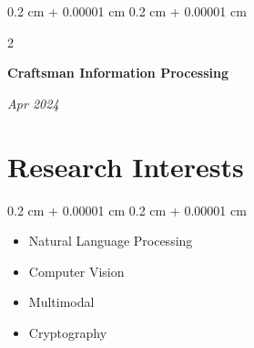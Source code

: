 \documentclass[10pt, letterpaper]{article}
\newenvironment{highlightsforbulletentries}{
    \begin{itemize}[
        topsep=0.10 cm,
        parsep=0.10 cm,
        partopsep=0pt,
        itemsep=0pt,
        leftmargin=10pt
    ]
}{
    \end{itemize}
} %
\newenvironment{onecolentry}{
    \begin{adjustwidth}{
        0.2 cm + 0.00001 cm
    }{
        0.2 cm + 0.00001 cm
    }
}{
    \end{adjustwidth}
} %
\newenvironment{twocolentry}[2][]{
    \onecolentry
    \def\secondColumn{#2}
    \setcolumnwidth{\fill, 4.5 cm}
    \begin{paracol}{2}
}{
    \switchcolumn \raggedleft \secondColumn
    \end{paracol}
    \endonecolentry
} %
\begin{document}
        \begin{twocolentry}{
            
        \textit{Apr 2024}}
            \textbf{Craftsman Information Processing}
        \end{twocolentry}
        
        \vspace{0.2 cm}

 
    
    \section{Research Interests}
        
        \begin{onecolentry}
            \begin{highlightsforbulletentries}
                \item Natural Language Processing
                \item Computer Vision
                \item Multimodal
                \item Cryptography
            \end{highlightsforbulletentries}
        \end{onecolentry}
\end{document}
